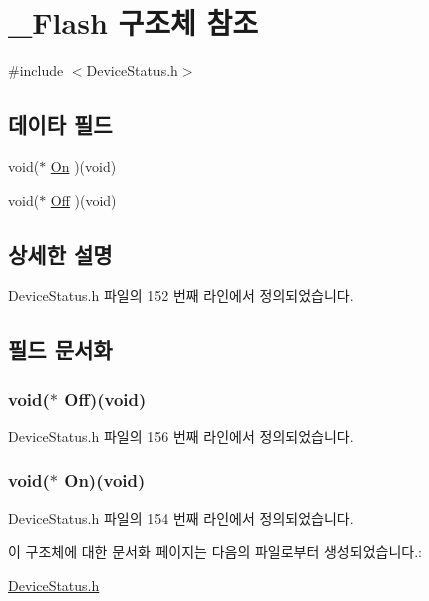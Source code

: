 \hypertarget{struct___flash}{\section{\-\_\-\-Flash 구조체 참조}
\label{struct___flash}
}


{\ttfamily \#include $<$Device\-Status.\-h$>$}

\subsection*{데이타 필드}
\begin{DoxyCompactItemize}
\item 
void($\ast$ \hyperlink{struct___flash_af15598d60e5c6b8cace1dce5638b2aab}{On} )(void)
\item 
void($\ast$ \hyperlink{struct___flash_a78a408255e4b030f97997dcc31648b7b}{Off} )(void)
\end{DoxyCompactItemize}


\subsection{상세한 설명}


Device\-Status.\-h 파일의 152 번째 라인에서 정의되었습니다.



\subsection{필드 문서화}
\hypertarget{struct___flash_a78a408255e4b030f97997dcc31648b7b}{
\subsubsection[{Off}]{\setlength{\rightskip}{0pt plus 5cm}void($\ast$  Off)(void)}}\label{struct___flash_a78a408255e4b030f97997dcc31648b7b}


Device\-Status.\-h 파일의 156 번째 라인에서 정의되었습니다.

\hypertarget{struct___flash_af15598d60e5c6b8cace1dce5638b2aab}{
\subsubsection[{On}]{\setlength{\rightskip}{0pt plus 5cm}void($\ast$  On)(void)}}\label{struct___flash_af15598d60e5c6b8cace1dce5638b2aab}


Device\-Status.\-h 파일의 154 번째 라인에서 정의되었습니다.



이 구조체에 대한 문서화 페이지는 다음의 파일로부터 생성되었습니다.\-:\begin{DoxyCompactItemize}
\item 
\hyperlink{_device_status_8h}{Device\-Status.\-h}\end{DoxyCompactItemize}
